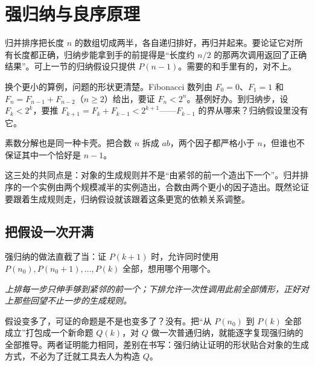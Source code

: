 \section{强归纳与良序原理}
\label{sec:01-Mathematical-Language/04-Induction-and-Recursion/02}

归并排序把长度 \(n\) 的数组切成两半，各自递归排好，再归并起来。要论证它对所有长度都正确，归纳步能拿到手的前提得是``长度约 \(n/2\) 的那两次调用返回了正确结果''。可上一节的归纳假设只提供 \(P(n-1)\)。需要的和手里有的，对不上。

换个更小的算例，问题的形状更清楚。Fibonacci 数列由 \(F_0=0\)、\(F_1=1\) 和 \(F_n=F_{n-1}+F_{n-2}\)（\(n\ge2\)）给出，要证 \(F_n<2^n\)。基例好办。到归纳步，设 \(F_k<2^k\)，要推 \(F_{k+1}=F_k+F_{k-1}<2^{k+1}\)——\(F_{k-1}\) 的界从哪来？归纳假设里没有它。

素数分解也是同一种卡壳。把合数 \(n\) 拆成 \(ab\)，两个因子都严格小于 \(n\)，但谁也不保证其中一个恰好是 \(n-1\)。

这三处的共同点是：对象的生成规则并不是``由紧邻的前一个造出下一个''。归并排序的一个实例由两个规模减半的实例造出，合数由两个更小的因子造出。既然论证要跟着生成规则走，归纳假设就该跟着这条更宽的依赖关系调整。

\subsection{把假设一次开满}

强归纳的做法直截了当：证 \(P(k+1)\) 时，允许同时使用 \(P(n_0),P(n_0+1),\dots,P(k)\) 全部，想用哪个用哪个。

\begin{center}

\emph{上排每一步只伸手够到紧邻的前一个；下排允许一次性调用此前全部情形，正好对上那些回望不止一步的生成规则。}
\end{center}

假设变多了，可证的命题是不是也变多了？没有。把``从 \(P(n_0)\) 到 \(P(k)\) 全部成立''打包成一个新命题 \(Q(k)\)，对 \(Q\) 做一次普通归纳，就能逐字复现强归纳的全部推导。两者证明能力相同，差别在书写：强归纳让证明的形状贴合对象的生成方式，不必为了迁就工具去人为构造 \(Q\)。

